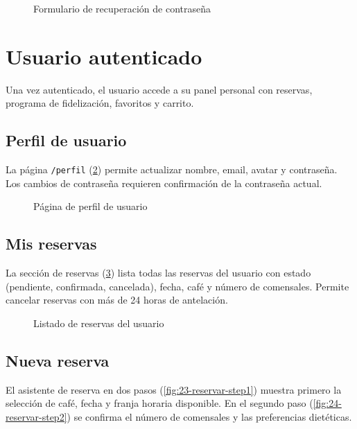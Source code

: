 \documentclass[12pt,a4paper,twoside,openright]{report}
\begin{document}
\begin{figure}[H]
  \centering
  \fbox{\rule{0pt}{6cm}\rule{12cm}{0pt}}
  \caption{Formulario de recuperación de contraseña}
  \label{fig:15-forgot-password}
\end{figure}

\section{Usuario autenticado}
\label{sec:manual-usuario}

Una vez autenticado, el usuario accede a su panel personal con reservas, programa de
fidelización, favoritos y carrito.

\subsection{Perfil de usuario}
La página \texttt{/perfil} (\cref{fig:19-perfil}) permite actualizar nombre, email,
avatar y contraseña. Los cambios de contraseña requieren confirmación de la contraseña
actual.

\begin{figure}[H]
  \centering
  \fbox{\rule{0pt}{6cm}\rule{12cm}{0pt}}
  \caption{Página de perfil de usuario}
  \label{fig:19-perfil}
\end{figure}

\subsection{Mis reservas}
La sección de reservas (\cref{fig:22-mis-reservas}) lista todas las reservas del
usuario con estado (pendiente, confirmada, cancelada), fecha, café y número de
comensales. Permite cancelar reservas con más de 24 horas de antelación.

\begin{figure}[H]
  \centering
  \fbox{\rule{0pt}{6cm}\rule{12cm}{0pt}}
  \caption{Listado de reservas del usuario}
  \label{fig:22-mis-reservas}
\end{figure}

\subsection{Nueva reserva}
El asistente de reserva en dos pasos (\cref{fig:23-reservar-step1}) muestra
primero la selección de café, fecha y franja horaria disponible. En el segundo
paso (\cref{fig:24-reservar-step2}) se confirma el número de comensales y las
preferencias dietéticas.
\end{document}
